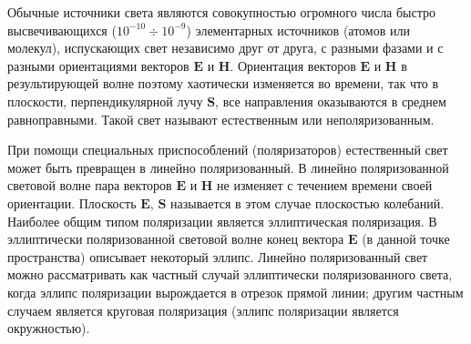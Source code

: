 \documentclass[a4paper, 12pt, twoside]{article}
\begin{document}
	Обычные источники света являются совокупностью огромного числа быстро высвечивающихся ($10^{-10} \div 10^{-9}$) элементарных источников (атомов или молекул), испускающих свет независимо друг от друга, с разными фазами и с разными ориентациями векторов $\mathbf{E}$ и $\mathbf{H}$. Ориентация векторов $\mathbf{E}$ и $\mathbf{H}$ в результирующей волне поэтому хаотически изменяется во времени, так что в плоскости, перпендикулярной лучу $\mathbf{S}$, все направления оказываются в среднем равноправными. Такой свет называют естественным или неполяризованным.
	
	При помощи специальных приспособлений (поляризаторов) естественный свет может быть превращен в линейно поляризованный. В линейно поляризованной световой волне пара векторов $\mathbf{E}$ и $\mathbf{H}$ не изменяет с течением времени своей ориентации. Плоскость $\mathbf{E}$, $\mathbf{S}$ называется в этом случае плоскостью колебаний.
	Наиболее общим типом поляризации является эллиптическая поляризация. В эллиптически поляризованной световой волне конец вектора	$\mathbf{E}$ (в данной точке пространства) описывает некоторый эллипс. Линейно поляризованный свет можно рассматривать как частный случай эллиптически поляризованного света, когда эллипс поляризации вырождается в отрезок прямой линии; другим частным случаем является круговая поляризация (эллипс поляризации является окружностью).\\
	
\end{document}
